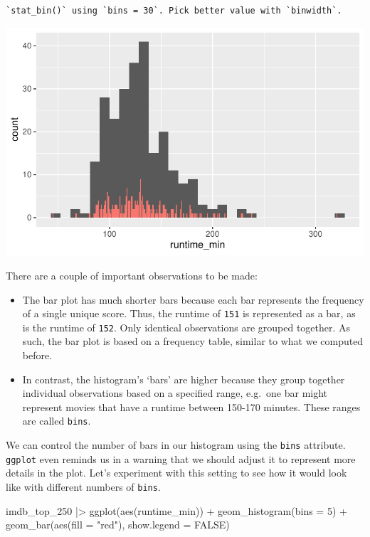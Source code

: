 \documentclass[
  letterpaper,
]{krantz}
\makeatletter
\newenvironment{Shaded}{\begin{snugshade}}{\end{snugshade}}
\newcommand{\AttributeTok}[1]{\textcolor[rgb]{0.40,0.45,0.13}{#1}}
\newcommand{\ConstantTok}[1]{\textcolor[rgb]{0.56,0.35,0.01}{#1}}
\newcommand{\DecValTok}[1]{\textcolor[rgb]{0.68,0.00,0.00}{#1}}
\newcommand{\FunctionTok}[1]{\textcolor[rgb]{0.28,0.35,0.67}{#1}}
\newcommand{\NormalTok}[1]{\textcolor[rgb]{0.00,0.23,0.31}{#1}}
\newcommand{\SpecialCharTok}[1]{\textcolor[rgb]{0.37,0.37,0.37}{#1}}
\newcommand{\StringTok}[1]{\textcolor[rgb]{0.13,0.47,0.30}{#1}}
\newenvironment{kframe}{%
\medskip{}
\setlength{\fboxsep}{.8em}
 \def\at@end@of@kframe{}%
 \ifinner\ifhmode%
  \def\at@end@of@kframe{\end{minipage}}%
  \begin{minipage}{\columnwidth}%
 \fi\fi%
 \def\FrameCommand##1{\hskip\@totalleftmargin \hskip-\fboxsep
 \colorbox{shadecolor}{##1}\hskip-\fboxsep
     \hskip-\linewidth \hskip-\@totalleftmargin \hskip\columnwidth}%
 \MakeFramed {\advance\hsize-\width
   \@totalleftmargin\z@ \linewidth\hsize
   \@setminipage}}%
 {\par\unskip\endMakeFramed%
 \at@end@of@kframe}
\renewenvironment{Shaded}{\begin{kframe}}{\end{kframe}}
\makeatother
\begin{document}
\begin{verbatim}
`stat_bin()` using `bins = 30`. Pick better value with `binwidth`.
\end{verbatim}

\includegraphics{08_descriptive_statistics_files/figure-pdf/histogram-vs-barplot-1.pdf}

There are a couple of important observations to be made:

\begin{itemize}
\item
  The bar plot has much shorter bars because each bar represents the
  frequency of a single unique score. Thus, the runtime of \texttt{151}
  is represented as a bar, as is the runtime of \texttt{152}. Only
  identical observations are grouped together. As such, the bar plot is
  based on a frequency table, similar to what we computed before.
\item
  In contrast, the histogram's `bars' are higher because they group
  together individual observations based on a specified range, e.g.~one
  bar might represent movies that have a runtime between 150-170
  minutes. These ranges are called \texttt{bins}.
\end{itemize}

We can control the number of bars in our histogram using the
\texttt{bins} attribute. \texttt{ggplot} even reminds us in a warning
that we should adjust it to represent more details in the plot. Let's
experiment with this setting to see how it would look like with
different numbers of \texttt{bins}.

\begin{Shaded}
\begin{Highlighting}[]
\NormalTok{imdb\_top\_250 }\SpecialCharTok{|\textgreater{}}
  \FunctionTok{ggplot}\NormalTok{(}\FunctionTok{aes}\NormalTok{(runtime\_min)) }\SpecialCharTok{+}
  \FunctionTok{geom\_histogram}\NormalTok{(}\AttributeTok{bins =} \DecValTok{5}\NormalTok{) }\SpecialCharTok{+}
  \FunctionTok{geom\_bar}\NormalTok{(}\FunctionTok{aes}\NormalTok{(}\AttributeTok{fill =} \StringTok{"red"}\NormalTok{), }\AttributeTok{show.legend =} \ConstantTok{FALSE}\NormalTok{)}
\end{Highlighting}
\end{Shaded}
\end{document}
